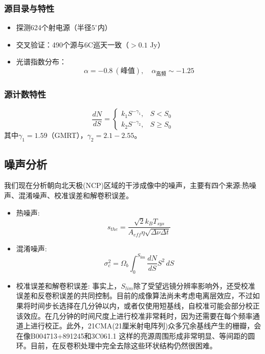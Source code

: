\documentclass{article}
\begin{document}
\subsubsection{源目录与特性}
\begin{itemize}
\item 探测624个射电源（半径$5^\circ$内）
\item 交叉验证：490个源与6C巡天一致（$>0.1$ Jy）
\item 光谱指数分布：
  \begin{equation}
    \alpha = -0.8\ (\text{峰值}),\quad \alpha_{\text{高频}} \sim -1.25
  \end{equation}
\end{itemize}

\subsubsection{源计数特性}
\begin{equation}
\frac{dN}{dS} = 
\begin{cases}
k_1 S^{-\gamma_1}, & S < S_0 \\
k_2 S^{-\gamma_2}, & S \geq S_0
\end{cases}
\end{equation}
其中$\gamma_1=1.59$（GMRT），$\gamma_2=2.1-2.55$。

\subsection{噪声分析}
我们现在分析朝向北天极(NCP)区域的干涉成像中的噪声，主要有四个来源:热噪声、混淆噪声、校准误差和解卷积误差。
\begin{itemize}
    \item 热噪声: $$s_{the} = \frac{ \sqrt{2} k_B T_{sys}} {A_{eff} \eta \sqrt{\Delta\nu \Delta t}}$$
    \item 混淆噪声:
    \begin{equation}
    \sigma_{c}^{2} = \Omega_{b} \int_{0}^{S_{\text{lim}}} \frac{dN}{dS} S^{2} \, dS
    \label{eq:sigma_squared}
    \end{equation}
    \item 校准误差和解卷积误差: 事实上，$S_{lim}$除了受望远镜分辨率影响外，还受校准误差和反卷积误差的共同控制。目前的成像算法尚未考虑电离层效应，不过如果将时间步长选择在几分钟以内，或者仅使用短基线，自校准可能会部分校正该效应。在几分钟的时间尺度上进行校准非常耗时，因为还需要在每个频率通道上进行校正。此外，21CMA(21厘米射电阵列)众多冗余基线产生的栅瓣，会在像B004713+891245和3C061.1 这样的亮源周围形成非常明显、等间距的圆环。目前，在反卷积处理中完全去除这些环状结构仍然很困难。
\end{itemize}
\end{document}
